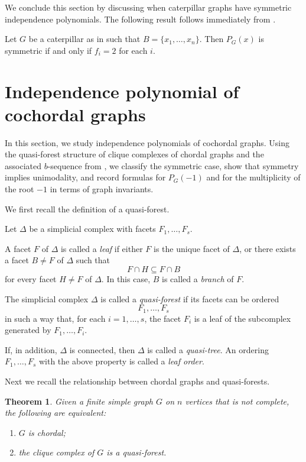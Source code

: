\documentclass[12pt]{amsart}
\theoremstyle{plain}
\newtheorem{thm}{Theorem}[section]
\theoremstyle{definition}
\begin{document}
We conclude this section by discussing when caterpillar graphs have symmetric independence polynomials. The following result follows immediately from  .

\begin{cor}
 Let \(G\) be a caterpillar as in  such that $B=\{x_1,\ldots, x_n\}$. Then $P_G(x)$ is symmetric if and only if $f_i=2$ for each $i$.    
\end{cor}



\section{Independence polynomial of cochordal graphs}


In this section, we study independence polynomials of cochordal graphs. Using the quasi-forest structure of clique complexes of chordal graphs and the associated \(b\)-sequence from \cite{Combinatorica_cochordal}, we classify the symmetric case, show that symmetry implies unimodality, and record formulas for \(P_G(-1)\) and for the multiplicity of the root \(-1\) in terms of graph invariants.



We first recall the definition of a quasi-forest.

\begin{defn}
Let \(\Delta\) be a simplicial complex with facets \(F_1,\dots,F_s\).

A facet \(F\) of \(\Delta\) is called a \emph{leaf} if either \(F\) is the unique facet of \(\Delta\), or there exists a facet \(B\neq F\) of \(\Delta\) such that
\[
F\cap H \subseteq F\cap B
\]
for every facet \(H\neq F\) of \(\Delta\). In this case, \(B\) is called a \emph{branch} of \(F\).

The simplicial complex \(\Delta\) is called a \emph{quasi-forest} if its facets can be ordered
\[
F_1,\dots,F_s
\]
in such a way that, for each \(i=1,\dots,s\), the facet \(F_i\) is a leaf of the subcomplex
generated by \(F_1,\dots,F_i\).

If, in addition, \(\Delta\) is connected, then \(\Delta\) is called a \emph{quasi-tree}.
An ordering \(F_1,\dots,F_s\) with the above property is called a \emph{leaf order}.
\end{defn}

Next we recall the relationship between chordal graphs and quasi-forests.


\begin{thm}\label{chordal_quasi-forest}\cite[Theorem 9.2.12]{monomial_ideals_book}
  Given a finite simple graph $G$ on $n$ vertices that is not complete, the following are equivalent:
  \begin{enumerate}
      \item[(i)] $G$ is chordal;
      \item[(ii)] the clique complex of $G$ is a quasi-forest.
  \end{enumerate}
\end{thm}
\end{document}
